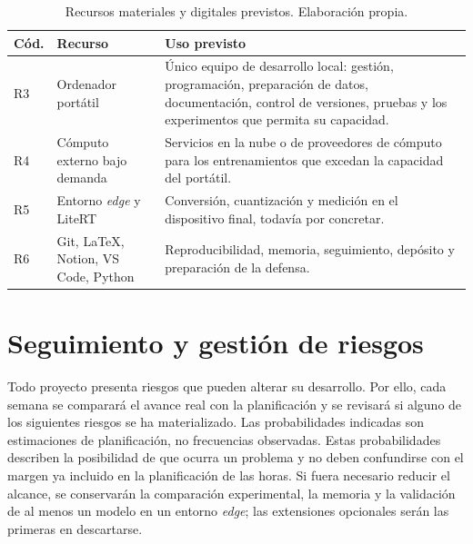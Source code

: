 \begin{table}[H]
  \centering
  \small
  \begin{tabularx}{\textwidth}{C{0.9cm}L{3.0cm}Y}
    \toprule
    \textbf{Cód.} & \textbf{Recurso} & \textbf{Uso previsto} \\
    \midrule
    R3 & Ordenador portátil & Único equipo de desarrollo local: gestión, programación, preparación de datos, documentación, control de versiones, pruebas y los experimentos que permita su capacidad. \\
    R4 & Cómputo externo bajo demanda & Servicios en la nube o de proveedores de cómputo para los entrenamientos que excedan la capacidad del portátil. \\
    R5 & Entorno \emph{edge} y LiteRT & Conversión, cuantización y medición en el dispositivo final, todavía por concretar. \\
    R6 & Git, LaTeX, Notion, VS Code, Python & Reproducibilidad, memoria, seguimiento, depósito y preparación de la defensa. \\
    \bottomrule
  \end{tabularx}
  \caption[Recursos materiales y digitales]{Recursos materiales y digitales
  previstos. Elaboración propia.}
  \label{tab:planificacion-recursos}
\end{table}

\clearpage
\section{Seguimiento y gestión de riesgos}
\label{sec:gestion-riesgos}

\begingroup
\small

Todo proyecto presenta riesgos que pueden alterar su desarrollo. Por ello, cada
semana se comparará el avance real con la planificación y se revisará si alguno
de los siguientes riesgos se ha materializado. Las probabilidades indicadas son
estimaciones de planificación, no frecuencias observadas. Estas probabilidades
describen la posibilidad de que ocurra un problema y no deben confundirse con
el margen ya incluido en la planificación de las horas. Si fuera necesario
reducir el alcance, se conservarán la comparación experimental, la memoria y la
validación de al menos un modelo en un entorno \emph{edge}; las extensiones
opcionales serán las primeras en descartarse.

